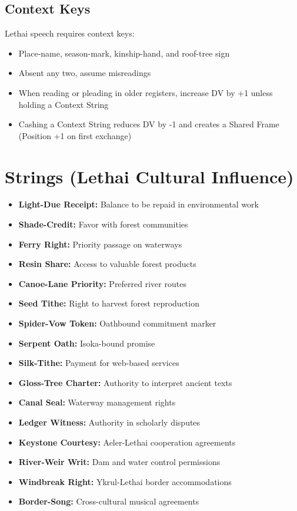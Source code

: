 \documentclass[11pt]{article}
\newcommand{\stringtype}[1]{\textbf{#1}}
\begin{document}
\subsection*{Context Keys}
Lethai speech requires context keys:
\begin{itemize}
  \item Place-name, season-mark, kinship-hand, and roof-tree sign
  \item Absent any two, assume misreadings
  \item When reading or pleading in older registers, increase DV by +1 unless holding a Context String
  \item Cashing a Context String reduces DV by -1 and creates a Shared Frame (Position +1 on first exchange)
\end{itemize}

\section*{Strings (Lethai Cultural Influence)}
\begin{itemize}
  \item \stringtype{Light-Due Receipt:} Balance to be repaid in environmental work
  \item \stringtype{Shade-Credit:} Favor with forest communities
  \item \stringtype{Ferry Right:} Priority passage on waterways
  \item \stringtype{Resin Share:} Access to valuable forest products
  \item \stringtype{Canoe-Lane Priority:} Preferred river routes
  \item \stringtype{Seed Tithe:} Right to harvest forest reproduction
  \item \stringtype{Spider-Vow Token:} Oathbound commitment marker
  \item \stringtype{Serpent Oath:} Isoka-bound promise
  \item \stringtype{Silk-Tithe:} Payment for web-based services
  \item \stringtype{Gloss-Tree Charter:} Authority to interpret ancient texts
  \item \stringtype{Canal Seal:} Waterway management rights
  \item \stringtype{Ledger Witness:} Authority in scholarly disputes
  \item \stringtype{Keystone Courtesy:} Aeler-Lethai cooperation agreements
  \item \stringtype{River-Weir Writ:} Dam and water control permissions
  \item \stringtype{Windbreak Right:} Ykrul-Lethai border accommodations
  \item \stringtype{Border-Song:} Cross-cultural musical agreements
\end{itemize}
\end{document}

